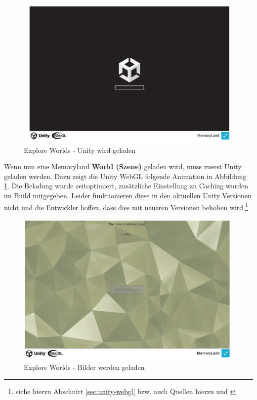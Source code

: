 \begin{figure} [h t]
    \centering
    \includegraphics[scale=0.5]{pics/explore_worlds_loading_unity.PNG}
    \caption{Explore Worlds - Unity wird geladen}
    \label{fig:explore-worlds-loading-unity}
\end{figure}

Wenn nun eine Memoryland \textbf{World (Szene)} geladen wird, muss zuerst Unity geladen werden. Dazu zeigt die Unity WebGL folgende Animation in Abbildung \ref{fig:explore-worlds-loading-unity}. Die Beladung wurde zeitoptimiert, zusätzliche Einstellung zu Caching wurden im Build mitgegeben. Leider funktionieren diese in den aktuellen Unity Versionen nicht und die Entwickler hoffen, dass dies mit neueren Versionen behoben wird.\footnote{siehe hierzu Abschnitt \ref{sec:unity-webgl} bzw. auch Quellen hierzu \cite{UnityDocsDataCachingIssue} und \cite{UnityDocsDataCachingIssue2}}


\begin{figure} [h t]
    \centering
    \includegraphics[scale=0.5]{pics/explore_worlds_loading.PNG}
    \caption{Explore Worlds - Bilder werden geladen}
    \label{fig:explore-worlds-loading}
\end{figure}


